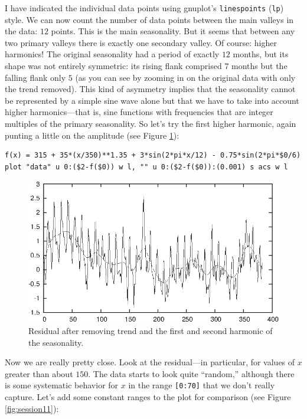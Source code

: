 I have indicated the individual data points using gnuplot's
\texttt{linespoints} (\texttt{lp}) style. We can now count the number
of data points between the main valleys in the data: $12$ points.
This is the main seasonality. But it seems that between any two
primary valleys there is exactly one secondary valley. Of course:
higher harmonics! The original seasonality had a period of exactly
$12$ months, but its shape was not entirely symmetric: its rising
flank comprised $7$ months but the falling flank only $5$ (as you can
see by zooming in on the original data with only the trend removed).
This kind of asymmetry implies that the seasonality cannot be
represented by a simple sine wave alone but that we have to take
into account higher harmonics---that is, sine functions with frequencies
that are integer multiples of the primary seasonality. So let's try
the first higher harmonic, again punting a little on the amplitude
(see Figure \ref{fig:session10}):

\begin{verbatim}
f(x) = 315 + 35*(x/350)**1.35 + 3*sin(2*pi*x/12) - 0.75*sin(2*pi*$0/6)
plot "data" u 0:($2-f($0)) w l, "" u 0:($2-f($0)):(0.001) s acs w l
\end{verbatim}

\begin{figure}[t!]
  \centerline{\includegraphics{img/session10}}
  \caption{Residual after removing trend and the first and second
    harmonic of the seasonality.}
  \label{fig:session10}
\end{figure}
    
Now we are really pretty close. Look at the residual---in particular,
for values of $x$ greater than about $150$. The data starts to look
quite ``random,'' although there is some systematic behavior for $x$
in the range \texttt{[0:70]} that we don't really capture. Let's add
some constant ranges to the plot for comparison (see Figure
\ref{fig:session11}):

